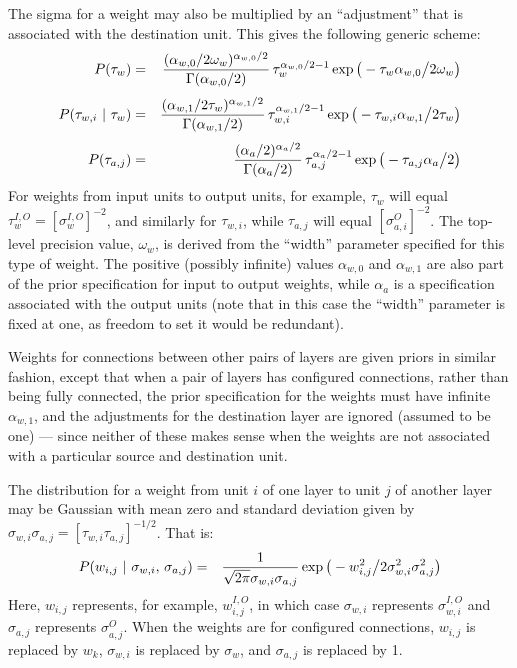 \documentclass{report}[11pt]
\def\beq{\begin{eqnarray}}
\def\eeq{\end{eqnarray}}
\begin{document}
The sigma for a weight may also be multiplied by an ``adjustment'' that
is associated with the destination unit.  This gives the following 
generic scheme:\beq
  P(\tau_w)
   & = & {(\alpha_{w,0}/2\omega_w)^{\alpha_{w,0}/2} 
          \over \Gamma(\alpha_{w,0}/2)}\,
         \tau_w^{\alpha_{w,0}/2-1}
         \exp \big(-\tau_w \alpha_{w,0} \big/ 2 \omega_w\big) \\[3pt]
  P(\tau_{w,i}\ |\ \tau_w)
   & = & {(\alpha_{w,1}/2\tau_w)^{\alpha_{w,1}/2} 
          \over \Gamma(\alpha_{w,1}/2)}\,
         \tau_{w,i}^{\alpha_{w,1}/2-1}
         \exp\big(-\tau_{w,i} \alpha_{w,1} \big/ 2 \tau_w\big) \\[3pt]
  P(\tau_{a,j})
   & = & { (\alpha_a/2)^{\alpha_a/2} \over \Gamma(\alpha_a/2) }\,
         \tau_{a,j}^{\alpha_a/2-1} \exp\big(-\tau_{a,j} \alpha_a \big/ 2\big)
\eeq%
For weights from input units to output units, for example, $\tau_w$
will equal $\tau^{I,O}_w = [\sigma^{I,O}_w]^{-2}$, and similarly for
$\tau_{w,i}$, while $\tau_{a,j}$ will equal $[\sigma^O_{a,i}]^{-2}$.
The top-level precision value, $\omega_w$, is derived from the
``width'' parameter specified for this type of weight. The positive
(possibly infinite) values $\alpha_{w,0}$ and $\alpha_{w,1}$ are
also part of the prior specification for input to output weights,
while $\alpha_a$ is a specification associated with the output units
(note that in this case the ``width'' parameter is fixed at one, as
freedom to set it would be redundant).

Weights for connections between other pairs of layers are given priors
in similar fashion, except that when a pair of layers has configured
connections, rather than being fully connected, the prior
specification for the weights must have infinite $\alpha_{w,1}$, and
the adjustments for the destination layer are ignored (assumed to be
one) --- since neither of these makes sense when the weights are not
associated with a particular source and destination unit.

The distribution for a weight from unit $i$ of one layer to unit $j$ of
another layer may be Gaussian with mean zero and standard deviation given 
by $\sigma_{w,i}\sigma_{a,j} = [\tau_{w,i}\tau_{a,j}]^{-1/2}$. That is:\beq
  P(w_{i,j}\ |\ \sigma_{w,i},\,\sigma_{a,j}) & = &
    {1 \over \sqrt{2\pi} \sigma_{w,i}\sigma_{a,j}} 
    \exp \big( - w_{i,j}^2 \big/ 2\sigma_{w,i}^2\sigma_{a,j}^2 \big)
\label{priorwg}\eeq%
Here, $w_{i,j}$ represents, for example, $w^{I,O}_{i,j}$, in which case
$\sigma_{w,i}$ represents $\sigma^{I,O}_{w,i}$ and $\sigma_{a,j}$ represents
$\sigma^O_{a,j}$.  When the weights are for configured connections, $w_{i,j}$
is replaced by $w_k$, $\sigma_{w,i}$ is replaced by $\sigma_w$, and
$\sigma_{a,j}$ is replaced by 1.
\end{document}

